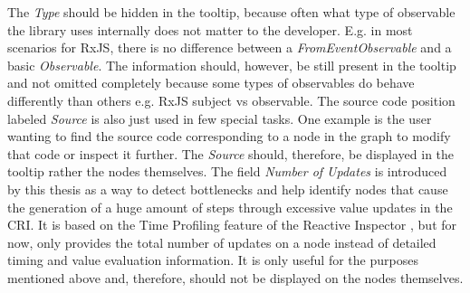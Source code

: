 The \emph{Type} should be hidden in the tooltip, because often what type of observable the library uses internally does not matter to the developer. E.g. in most scenarios for RxJS, there is no difference between a \emph{FromEventObservable} and a basic \emph{Observable}. The information should, however, be still present in the tooltip and not omitted completely because some types of observables do behave differently than others e.g. RxJS subject vs observable. The source code position labeled \emph{Source} is also just used in few special tasks. One example is the user wanting to find the source code corresponding to a node in the graph to modify that code or inspect it further. The \emph{Source} should, therefore, be displayed in the tooltip rather the nodes themselves. The field \emph{Number of Updates} is introduced by this thesis as a way to detect bottlenecks and help identify nodes that cause the generation of a huge amount of steps through excessive value updates in the CRI. It is based on the Time Profiling feature of the Reactive Inspector \cite{ReactiveInspector}, but for now, only provides the total number of updates on a node instead of detailed timing and value evaluation information. It is only useful for the purposes mentioned above and, therefore, should not be displayed on the nodes themselves.

